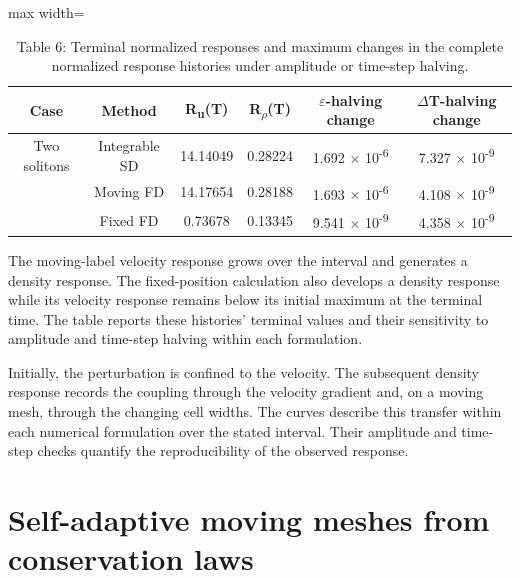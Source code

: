 \documentclass{article}
\begin{document}
\begin{table}[!htbp]
\centering
\caption*{Table 6: Terminal normalized responses and maximum changes in the complete normalized response histories under amplitude or time-step halving.}
\normalsize
\setlength{\tabcolsep}{6pt}
\renewcommand{\arraystretch}{1.25}\setlength{\extrarowheight}{1pt}
\setlength{\tabcolsep}{4pt}
\begin{adjustbox}{max width=\linewidth}
\begin{tabular}{cccccc}

\hline
\multicolumn{1}{c}{Case} & \multicolumn{1}{c}{Method} & \multicolumn{1}{c}{R\textsubscript{u}(T)} & \multicolumn{1}{c}{R\textsubscript{\(\rho\)}(T)} & \multicolumn{1}{c}{\(\varepsilon\)-halving change} & \multicolumn{1}{c}{\(\Delta\)T-halving change} \\
\hline
Two solitons & Integrable SD & 14.14049 & 0.28224 & 1.692 \(\times\) 10\textsuperscript{-6} & 7.327 \(\times\) 10\textsuperscript{-9} \\
 & Moving FD & 14.17654 & 0.28188 & 1.693 \(\times\) 10\textsuperscript{-6} & 4.108 \(\times\) 10\textsuperscript{-9} \\
 & Fixed FD & 0.73678 & 0.13345 & 9.541 \(\times\) 10\textsuperscript{-9} & 4.358 \(\times\) 10\textsuperscript{-9} \\
\hline
\end{tabular}
\end{adjustbox}
\end{table}

The moving-label velocity response grows over the interval and generates a density response. The fixed-position calculation also develops a density response while its velocity response remains below its initial maximum at the terminal time. The table reports these histories’ terminal values and their sensitivity to amplitude and time-step halving within each formulation.

Initially, the perturbation is confined to the velocity. The subsequent density response records the coupling through the velocity gradient and, on a moving mesh, through the changing cell widths. The curves describe this transfer within each numerical formulation over the stated interval. Their amplitude and time-step checks quantify the reproducibility of the observed response.


\FloatBarrier
\section{Self-adaptive moving meshes from conservation laws}
\end{document}
